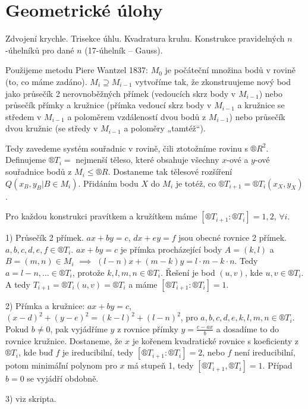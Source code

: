 \documentclass[12pt]{article}                   %
\begin{document}

\section{Geometrické úlohy}
    \begin{poznamka}
        Zdvojení krychle. Trisekce úhlu. Kvadratura kruhu. Konstrukce pravidelných $n$-úhelníků pro dané $n$ (17-úhelník -- Gauss).

        Použijeme metodu Piere Wantzel 1837: $M_0$ je počáteční množina bodů v rovině (to, co máme zadáno). $M_i \supseteq M_{i-1}$ vytvoříme tak, že zkonstruujeme nový bod jako průsečík 2 nerovnoběžných přímek (vedoucích skrz body v $M_{i-1}$) nebo průsečík přímky a kružnice (přímka vedoucí skrz body v $M_{i-1}$ a kružnice se středem v $M_{i-1}$ a poloměrem vzdáleností dvou bodů z $M_{i-1}$) nebo průsečík dvou kružnic (se středy v $M_{i - 1}$ a poloměry „tamtéž“).

        Tedy zavedeme systém souřadnic v rovině, čili ztotožníme rovinu s $®R^2$. Definujeme $®T_i =$ nejmenší těleso, které obsahuje všechny $x$-ové a $y$-ové souřadnice bodů z $M_i ≤ ®R$. Dostaneme tak tělesové rozšíření $Q(x_B, y_B | B \in M_i)$. Přidáním bodu $X$ do $M_i$ je totéž, co $®T_{i+1} = ®T_i(x_X, y_X)$.
    \end{poznamka}

    \begin{lemma}
        Pro každou konstrukci pravítkem a kružítkem máme $[®T_{i+1} : ®T_i] = 1, 2$, $\forall i$.

        \begin{dukazin}
            1) Průsečík 2 přímek. $ax + by = c$, $dx + ey = f$ jsou obecné rovnice 2 přímek. $a, b, c, d, e, f \in ®T_i$. $ax + by = c$ je přímka procházející body $A = (k, l)$ a $B = (m, n) \in M_i$ $\implies$ $(l-n)x + (m-k)y = l·m - k·n$. Tedy $a = l-n, … \in ®T_i$, protože $k, l, m, n \in ®T_i$. Řešení je bod $(u, v)$, kde $u, v \in ®T_i$. A tedy $T_{i+1} = ®T_i(u, v) = ®T_i$ a máme $[®T_{i+1}:®T_i] = 1$.

            2) Přímka a kružnice: $ax + by = c$, $(x - d)^2 + (y - e)^2 = (k-l)^2 + (l - n)^2$, pro $a, b, c, d, e, k, l, m, n \in ®T_i$. Pokud $b ≠ 0$, pak vyjádříme $y$ z rovnice přímky $y = \frac{c - ax}{b}$ a dosadíme to do rovnice kružnice. Dostaneme, že $x$ je kořenem kvadratické rovnice s koeficienty z $®T_i$, kde buď $f$ je ireducibilní, tedy $[®T_{i+1}:®T_i] = 2$, nebo $f$ není ireducibilní, potom minimáľní polynom pro $x$ má stupeň 1, tedy $[®T_{i+1}, ®T_i] = 1$. Případ $b = 0$ se vyjádří obdobně.

            3) viz skripta.
        \end{dukazin}
    \end{lemma}
\end{document}
